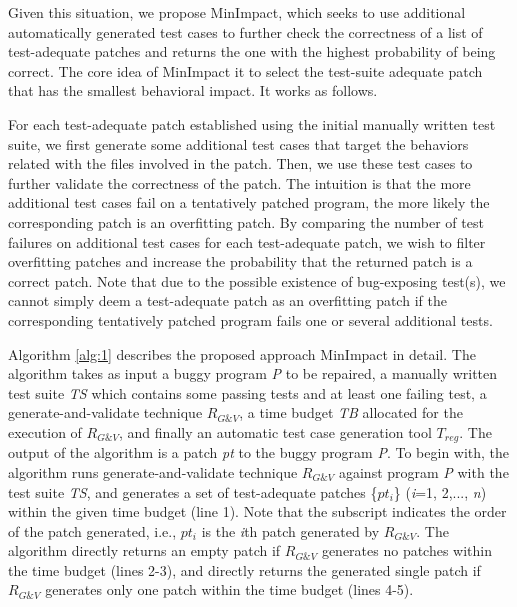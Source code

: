 \documentclass[]{sig-alternate}
\begin{document}
Given this situation, we propose MinImpact, which seeks to use additional automatically generated test cases to further check the correctness of a list of test-adequate patches and returns the one with the highest probability of being correct. 
The core idea of MinImpact it to select the test-suite adequate patch that has the smallest behavioral impact. It works as follows. 

For each test-adequate patch established using the initial manually written test suite, we first generate some additional test cases that target the behaviors related with the files involved in the patch. Then, we use these test cases to further validate the correctness of the patch. The intuition is that the more additional test cases fail on a tentatively patched program, the more likely the corresponding patch is an overfitting patch. By comparing the number of test failures on additional test cases for each test-adequate patch, we wish to filter overfitting patches and increase the probability that the returned patch is a correct patch. Note that due to the possible existence of bug-exposing test(s), we cannot simply deem a test-adequate patch as an overfitting patch if the corresponding tentatively patched program fails one or several additional tests. 

Algorithm \autoref{alg:1} describes the proposed approach MinImpact in detail. The algorithm takes as input a buggy program \emph{P} to be repaired, a manually written test suite \emph{TS} which contains some passing tests and at least one failing test, a generate-and-validate technique $R_{G\&V}$, a time budget \emph{TB} allocated for the execution of $R_{G\&V}$, and finally an automatic test case generation tool $T_{reg}$. The output of the algorithm is a patch \emph{pt} to the buggy program \emph{P}. To begin with, the algorithm runs generate-and-validate technique $R_{G\&V}$ against program \emph{P} with the test suite \emph{TS}, and generates a set of test-adequate patches \{$pt_{i}$\} (\emph{i}=1, 2,..., \emph{n}) within the given time budget (line 1). Note that the subscript indicates the order of the patch generated, i.e., $pt_{i}$ is the \emph{i}th patch generated by $R_{G\&V}$. The algorithm directly returns an empty patch if $R_{G\&V}$ generates no patches within the time budget (lines 2-3), and directly returns the generated single patch if $R_{G\&V}$ generates only one patch within the time budget (lines 4-5).  
\end{document}

